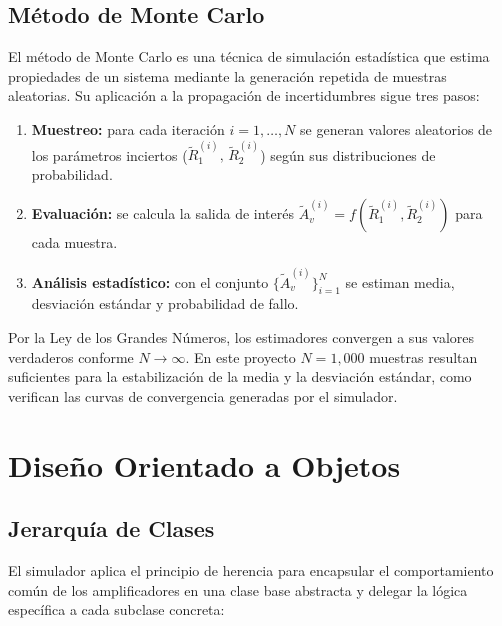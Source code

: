 ﻿\documentclass[12pt, letterpaper]{article}
\begin{document}
\subsection{Método de Monte Carlo}

El método de Monte Carlo es una técnica de simulación estadística \cite{robert2004} que estima
propiedades de un sistema mediante la generación repetida de muestras aleatorias.
Su aplicación a la propagación de incertidumbres sigue tres pasos:

\begin{enumerate}[leftmargin=2em]
    \item \textbf{Muestreo:} para cada iteración \(i = 1, \ldots, N\) se generan
          valores aleatorios de los parámetros inciertos
          (\(\tilde{R}_1^{(i)},\, \tilde{R}_2^{(i)}\)) según sus distribuciones
          de probabilidad.
    \item \textbf{Evaluación:} se calcula la salida de interés
          \(\tilde{A}_v^{(i)} = f(\tilde{R}_1^{(i)},\tilde{R}_2^{(i)})\) para
          cada muestra.
    \item \textbf{Análisis estadístico:} con el conjunto
          \(\{\tilde{A}_v^{(i)}\}_{i=1}^{N}\) se estiman media, desviación
          estándar y probabilidad de fallo.
\end{enumerate}

Por la Ley de los Grandes Números, los estimadores convergen a sus valores
verdaderos conforme \(N \to \infty\). En este proyecto \(N = 1{,}000\) muestras
resultan suficientes para la estabilización de la media y la desviación estándar,
como verifican las curvas de convergencia generadas por el simulador.

\section{Diseño Orientado a Objetos}

\subsection{Jerarquía de Clases}

El simulador aplica el principio de herencia para encapsular el comportamiento
común de los amplificadores en una clase base abstracta y delegar la lógica
específica a cada subclase concreta:
\end{document}
